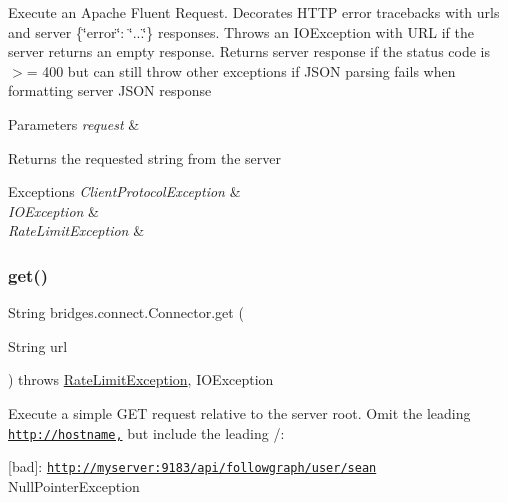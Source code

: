 Execute an Apache Fluent Request. Decorates H\+T\+TP error tracebacks with urls and server \{\char`\"{}error\char`\"{}\+: \char`\"{}...\char`\"{}\} responses. Throws an I\+O\+Exception with U\+RL if the server returns an empty response. Returns server response if the status code is $>$= 400 but can still throw other exceptions if J\+S\+ON parsing fails when formatting server J\+S\+ON response 
\begin{DoxyParams}{Parameters}
{\em request} & \\
\hline
\end{DoxyParams}
\begin{DoxyReturn}{Returns}
the requested string from the server 
\end{DoxyReturn}

\begin{DoxyExceptions}{Exceptions}
{\em Client\+Protocol\+Exception} & \\
\hline
{\em I\+O\+Exception} & \\
\hline
{\em Rate\+Limit\+Exception} & \\
\hline
\end{DoxyExceptions}
\mbox{\label{classbridges_1_1connect_1_1_connector_aec8d54bf707c50d6f8173a0c1640fcd5}} 
\subsubsection{\texorpdfstring{get()}{get()}}
{\footnotesize\ttfamily String bridges.\+connect.\+Connector.\+get (\begin{DoxyParamCaption}\item[{String}]{url }\end{DoxyParamCaption}) throws \hyperlink{classbridges_1_1validation_1_1_rate_limit_exception}{Rate\+Limit\+Exception}, I\+O\+Exception}

Execute a simple G\+ET request relative to the server root. Omit the leading \href{http://hostname,}{\tt http\+://hostname,} but include the leading /\+:

\mbox{[}bad\mbox{]}\+: \href{http://myserver:9183/api/followgraph/user/sean}{\tt http\+://myserver\+:9183/api/followgraph/user/sean} Null\+Pointer\+Exception \mbox{\label{classbridges_1_1connect_1_1_connector_a0b9809180aac96a83e31e224ab5ed6ec}} 

